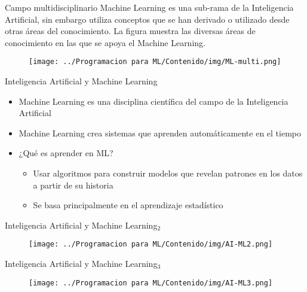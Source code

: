 \documentclass[11pt,aspectratio=169]{beamer}
\begin{document}
\begin{frame}{Campo multidisciplinario}
Machine Learning es una sub-rama de la Inteligencia Artificial, sin embargo utiliza conceptos que se han derivado o utilizado desde otras áreas del conocimiento. 
La figura  muestra las diversas áreas de conocimiento en las que se apoya el Machine Learning.\pause
\begin{figure}[H]
	\centering
	\texttt{[image: ../Programacion para ML/Contenido/img/ML-multi.png]}
\end{figure}
\end{frame}	

\begin{frame}{Inteligencia Artificial y Machine Learning}\pause

\begin{itemize}
	\item Machine Learning es una disciplina científica del campo de la Inteligencia Artificial\pause
	\item Machine Learning crea sistemas que aprenden automáticamente en el tiempo \pause
	\item ¿Qué es aprender en ML?\pause
	\begin{itemize}
		\item Usar algoritmos para construir modelos que revelan patrones en los datos a partir de su historia\pause
		\item Se basa principalmente en el aprendizaje estadístico
	\end{itemize}
\end{itemize}
\end{frame}

\begin{frame}{Inteligencia Artificial y Machine Learning$_2$}
\begin{figure}[H]
	\centering
	\texttt{[image: ../Programacion para ML/Contenido/img/AI-ML2.png]}
\end{figure}
\end{frame}

\begin{frame}{Inteligencia Artificial y Machine Learning$_3$}
\begin{figure}[H]
	\centering
	\texttt{[image: ../Programacion para ML/Contenido/img/AI-ML3.png]}
\end{figure}
\end{frame}
\end{document}
